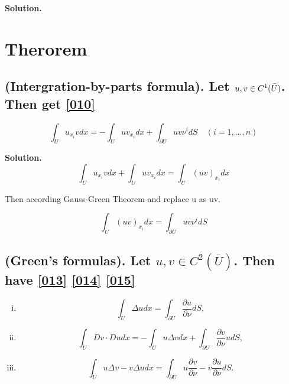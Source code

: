 \documentclass[a4paper]{book}
\newenvironment{solution}%
{\noindent\textbf{Solution.}}%
{\qedhere}
\numberwithin{equation}{chapter}
\theoremstyle{definition}
\begin{document}
\begin{multicols}{2}
\begin{solution}
\end{solution}

\section{Therorem}

\subsection{(Intergration-by-parts formula). Let $u,v \in \mathnormal{C}^1(\bar{U})$. Then get \ref{010} }

\begin{equation}\label{010}
	\int_U u_{x_i} v dx = - \int_U uv_{x_i} dx + \int_{\partial U} uv \nu^i dS \quad (i = 1,...,n)
\end{equation}

\begin{solution}
	\begin{equation}
		\int_U u_{x_i} v dx + \int_U uv_{x_i} dx = \int_U  (uv)_{x_i} dx 
	\end{equation}
	
	Then according Gauss-Green Theorem and replace u as uv.
	
	\begin{equation}
		\int_U  (uv)_{x_i} dx = \int_{\partial U} uv \nu^i dS
	\end{equation}
\end{solution}


\subsection{(Green's formulas). Let $u,v \in C^2(\bar{U})$. Then  have \ref{013} \ref{014} \ref{015}}
\begin{enumerate}[(i)]
	\item \begin{equation}\label{013}
		\int_U \Delta u dx = \int_{\partial U} \frac{\partial u}{\partial \nu} dS,
	\end{equation}
	
	\item \begin{equation}\label{014}
		\int_U Dv \cdot Du dx = - \int_U u \Delta v dx + \int_{\partial U } \frac{\partial v}{\partial \nu} u dS,
	\end{equation}
	\item \begin{equation}\label{015}
		\int_U u \Delta v - v \Delta u dx = \int_{\partial U} u \frac{\partial v}{\partial \nu} - v \frac{\partial u}{\partial \nu} dS.
	\end{equation}
\end{enumerate}


\end{multicols}
\end{document}
